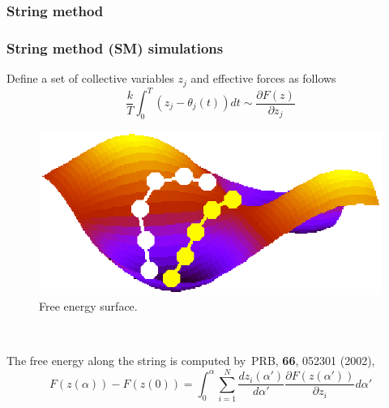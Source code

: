 \documentclass{beamer}
\newcommand\FourQuad[4]{%
    \begin{minipage}[b][.35\textheight][t]{.47\textwidth}#1\end{minipage}\hfill%
    \begin{minipage}[b][.35\textheight][t]{.47\textwidth}#2\end{minipage}\\[0.5em]
    \begin{minipage}[b][.35\textheight][t]{.47\textwidth}#3\end{minipage}\hfill
    \begin{minipage}[b][.35\textheight][t]{.47\textwidth}#4\end{minipage}%
}
\begin{document}
\subsubsection{String method} 
\begin{frame}
\frametitle{String method (SM) simulations}
\FourQuad%
{
Define a set of collective variables $z_j$ and  
effective forces as follows
\begin{equation*}
        \frac{k}{T} \int ^T_0 (z_j-\theta_j(t)) dt \sim \frac{\partial F(z)}{\partial z_j}
\end{equation*}
}%
{
\begin{figure}
\includegraphics[scale=0.4]{surface_string.eps}
\caption{{\scriptsize  Free energy surface. }}
\end{figure}
}%
{
The free energy along the string is computed by~{\scriptsize PRB, {\bf 66}, 052301 (2002)},
\begin{equation*}
        F(z(\alpha)) - F(z(0))= \int^{\alpha}_0 \sum^N_{i=1} \frac{dz_i(\alpha')}{d\alpha'}
        \frac{\partial F(z(\alpha'))}{\partial z_i} d\alpha'
\end{equation*}
}%
{
}
\end{frame}
\end{document}
